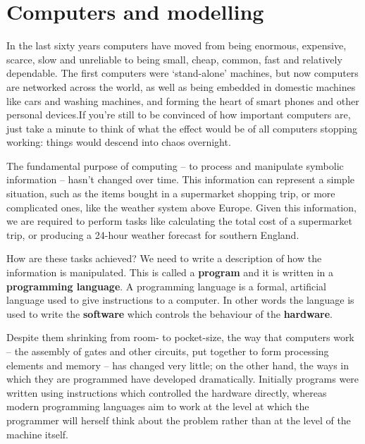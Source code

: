 \begin{webvideos}
\end{webvideos}

\section{Computers and modelling}

In the last sixty years computers have moved from being enormous,
expensive, scarce, slow and 
unreliable to being small, cheap, common, fast and relatively
dependable. The first computers were `stand-alone' machines, but now
computers are networked across the world, as well as being 
embedded in domestic machines like cars
and washing machines, and forming the heart of smart phones and other personal devices.If you're still to be convinced of how important computers are, just take a minute to think of what the effect would be of all computers stopping working: things would descend into chaos overnight.

The fundamental purpose of computing -- to process and 
manipulate symbolic information --  hasn't
changed over time. This information can represent a
simple situation, such as the items bought in a supermarket shopping trip,
or more complicated ones, like the weather system above Europe.
Given this information, we are required to perform tasks like 
calculating the total cost of a supermarket trip, or  producing a 
24-hour weather forecast for southern England.

How are these tasks achieved? We need to write a description of how the
information is manipulated. This is called a \textbf{program} and it 
is written in a
\textbf{programming language}. A programming
language is a formal, artificial language used
to give instructions to a computer. In other
words the language is used to write the \textbf{software}
which controls the behaviour of the \textbf{hardware}.

Despite them shrinking from room- to pocket-size, the way that computers work -- the assembly of gates and other circuits, put together to form processing elements and memory -- has changed very little; on the other hand, the ways in which they are programmed have developed
dramatically. Initially programs were written using instructions which
controlled the hardware directly, whereas modern programming languages
aim to work at the level at which the programmer will herself think about the problem  rather than at the 
level of the machine itself.

